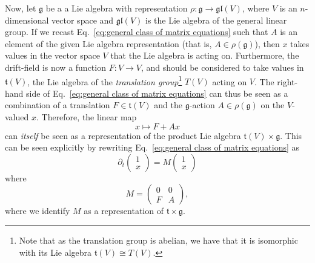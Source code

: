 Now, let $\mathfrak{g}$ be a a Lie algebra with representation $\rho : \mathfrak{g} \to \mathfrak{gl}(V)$, where $V$ is an $n$-dimensional vector space and $\mathfrak{gl}(V)$ is the Lie algebra of the general linear group. If we recast Eq.~\ref{eq:general class of matrix equations} such that $A$ is an element of the given Lie algebra representation (that is, $A \in \rho(\mathfrak{g})$), then $x$ takes values in the vector space $V$ that the Lie algebra is acting on. Furthermore, the drift-field is now a function $F : V \to V$, and should be considered to take values in $\mathfrak{t}(V)$, the Lie algebra of the \textit{translation group}\footnote{Note that as the translation group is abelian, we have that it is isomorphic with its Lie algebra $\mathfrak{t}(V) \cong T(V)$.} $T(V)$ acting on $V$. The right-hand side of Eq.~\ref{eq:general class of matrix equations} can thus be seen as a combination of a translation $F \in \mathfrak{t}(V)$ and the $\mathfrak{g}$-action $A\in \rho(\mathfrak{g})$ on the $V$-valued $x$. Therefore, the linear map
\begin{equation}
	x \mapsto F + Ax
\end{equation}
can \textit{itself} be seen as a representation of the product Lie algebra $\mathfrak{t}(V) \times \mathfrak{g}$. This can be seen explicitly by rewriting Eq.~\ref{eq:general class of matrix equations} as
\begin{equation} \label{eq:recast matrix equation}
	\partial_t \begin{pmatrix}
		1 \\ x
	\end{pmatrix} = M \begin{pmatrix}
		1 \\ x
	\end{pmatrix}
\end{equation} 
where
\begin{equation}
	M = \begin{pmatrix}
		0 & 0 \\
		F & A
	\end{pmatrix},
\end{equation}
where we identify $M$ as a representation of $\mathfrak{t} \times \mathfrak{g}$.

